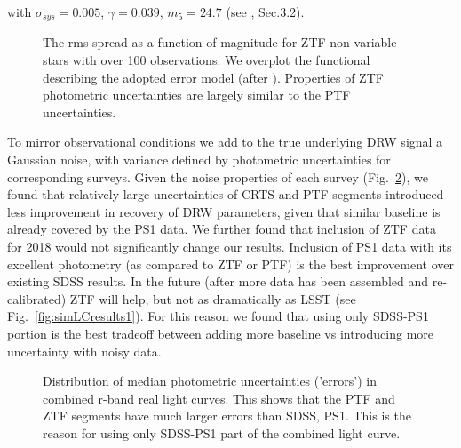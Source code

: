 \documentclass[twocolumn]{aastex62}
\begin{document}
with  $\sigma_{sys} = 0.005$, $\gamma=0.039$, $m_{5} = 24.7$ (see \citet{ivezic2019}, Sec.3.2).

\begin{figure*}%
\caption{Simulated DRW process sampled at the real cadence of SDSS, PS1 segments for quasar SDSSdbID=1072282,  adding the simulated LSST segment. The well-sampled true DRW signal was first sampled at SDSS-PS1-LSST cadences, and then Gaussian offset was added to each point to simulate observational noise. }
\label{fig:simLC}
\end{figure*} 

\begin{figure}%
\caption{The rms spread as a function of magnitude for ZTF non-variable stars with over 100 observations. We overplot the functional describing the adopted error model (after \citealt{ivezic2019}). Properties of ZTF photometric uncertainties are largely similar to the PTF uncertainties.}
\label{fig:ztf_errors}
\end{figure} 


To mirror observational conditions we add to the true underlying DRW signal a Gaussian noise, with variance defined by photometric uncertainties for corresponding surveys. Given the noise properties of each survey (Fig.~\ref{fig:combinedLCerrors}), we found that relatively large uncertainties of CRTS and PTF segments introduced less improvement in recovery of DRW parameters, given that similar baseline is already covered by the PS1 data.  We further found that inclusion of ZTF data for 2018 would not significantly change our results. Inclusion of PS1 data with its excellent photometry (as compared to ZTF or PTF) is the best improvement over existing SDSS results.  In the future (after more data has been assembled and re-calibrated) ZTF will help, but not as dramatically as LSST (see Fig.~\ref{fig:simLCresults1}).  For this reason we found that using only SDSS-PS1 portion is the best tradeoff between adding more baseline vs introducing more uncertainty with noisy data.

\begin{figure}%
\caption{Distribution of median photometric uncertainties ('errors') in combined r-band real light curves. This shows that the PTF and ZTF segments have much larger errors than SDSS, PS1. This is the reason for using only SDSS-PS1 part of the combined light curve.}
\label{fig:combinedLCerrors}
\end{figure} 
\end{document}
